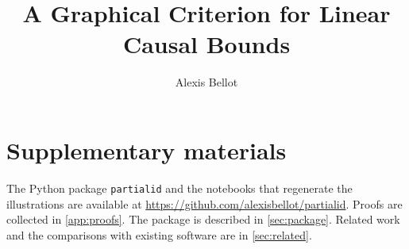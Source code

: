 \documentclass[11pt]{article}
\title{A Graphical Criterion for Linear Causal Bounds}
\author{Alexis Bellot}
\date{}
\newcommand{\pid}{\texorpdfstring{\textcolor{red!75!black}{\texttt{partialid}}}{partialid}}
\theoremstyle{definition}
\theoremstyle{remark}
\begin{document}
\maketitle








\section*{Supplementary materials}
The Python package \pid{} and the notebooks that regenerate the
illustrations are available at
\url{https://github.com/alexisbellot/partialid}.
Proofs are collected in \cref{app:proofs}. The package is described in \cref{sec:package}. Related work and the comparisons with existing software are in \cref{sec:related}.




\appendix
\clearpage
\startcontents[appendix]
\clearpage




\stopcontents[appendix]
\end{document}
